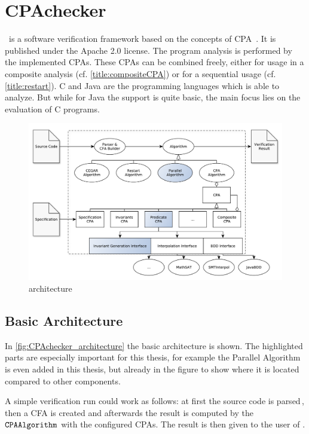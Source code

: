 
\section{CPAchecker}
\CPAchecker{}\, is a software verification framework based on the concepts of \ac{CPA}~\cite{Beyer:CPAchecker}. It is published under the Apache 2.0 license.  The program analysis is performed by the implemented CPAs. These CPAs can be combined freely, either for usage in a composite analysis (cf. \autoref{title:compositeCPA}) or for a sequential usage (cf. \autoref{title:restart}). C and Java are the programming languages which \CPAchecker{} is able to analyze. But while for Java the support is quite basic, the main focus lies on the evaluation of C programs.

\begin{figure}
 \includegraphics[width=\textwidth]{../graphics/CPAchecker_architecture}
 \caption{\CPAchecker{} architecture~\cite{Beyer:CPAchecker}}
 \label{fig:CPAchecker_architecture}
\end{figure}

\subsection{Basic Architecture}
In \autoref{fig:CPAchecker_architecture} the basic \CPAchecker{} architecture is shown. The highlighted parts are especially important for this thesis, for example the Parallel Algorithm is even added in this thesis, but already in the figure to show where it is located compared to other \CPAchecker{} components.

A simple verification run could work as follows: at first the source code is parsed\,, then a \ac{CFA} is created and afterwards the result is computed by the $\mathtt{CPAAlgorithm}{}$ with the configured \acp{CPA}. The result is then given to the user of \CPAchecker{}.

